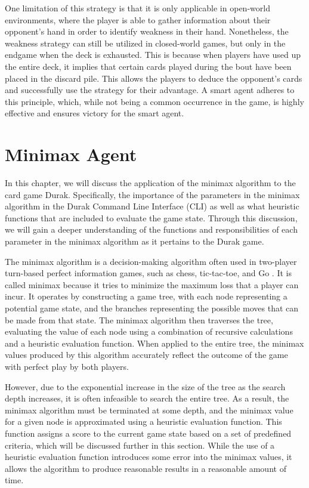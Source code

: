 One limitation of this strategy is that it is only applicable in open-world environments, where the player is able to gather information about their opponent's hand in order to identify weakness in their hand.  Nonetheless, the weakness strategy can still be utilized in closed-world games, but only in the endgame when the deck is exhausted. This is because when players have used up the entire deck, it implies that certain cards played during the bout have been placed in the discard pile. This allows the players to deduce the opponent's cards and successfully use the strategy for their advantage. A smart agent adheres to this principle, which, while not being a common occurrence in the game, is highly effective and ensures victory for the smart agent.

\section{Minimax Agent}
\label{minimax}

In this chapter, we will discuss the application of the minimax algorithm to the card game Durak. Specifically, the importance of the parameters in the minimax algorithm in the Durak Command Line Interface (CLI) as well as what heuristic functions that are included to evaluate the game state. Through this discussion, we will gain a deeper understanding of the functions and responsibilities of each parameter in the minimax algorithm as it pertains to the Durak game.

The minimax algorithm is a decision-making algorithm often used in two-player turn-based perfect information games, such as chess, tic-tac-toe, and Go \citep{AI4Ed}. It is called minimax because it tries to minimize the maximum loss that a player can incur. It operates by constructing a game tree, with each node representing a potential game state, and the branches representing the possible moves that can be made from that state. The minimax algorithm then traverses the tree, evaluating the value of each node using a combination of recursive calculations and a heuristic evaluation function. When applied to the entire tree, the minimax values produced by this algorithm accurately reflect the outcome of the game with perfect play by both players.

However, due to the exponential increase in the size of the tree as the search depth increases, it is often infeasible to search the entire tree. As a result, the minimax algorithm must be terminated at some depth, and the minimax value for a given node is approximated using a heuristic evaluation function. This function assigns a score to the current game state based on a set of predefined criteria, which will be discussed further in this section. While the use of a heuristic evaluation function introduces some error into the minimax values, it allows the algorithm to produce reasonable results in a reasonable amount of time.

